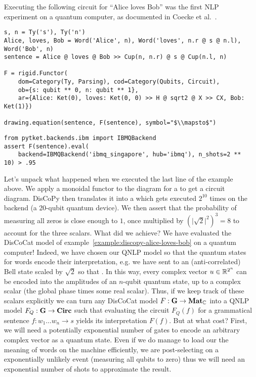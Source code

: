 \begin{example}\label{example:circuit-alive-loves-bob}
Executing the following circuit for ``Alice loves Bob'' was the first NLP experiment on a quantum computer, as documented in Coecke et al.~\cite{CoeckeEtAl20b}.

\begin{verbatim}
s, n = Ty('s'), Ty('n')
Alice, loves, Bob = Word('Alice', n), Word('loves', n.r @ s @ n.l), Word('Bob', n)
sentence = Alice @ loves @ Bob >> Cup(n, n.r) @ s @ Cup(n.l, n)

F = rigid.Functor(
    dom=Category(Ty, Parsing), cod=Category(Qubits, Circuit),
    ob={s: qubit ** 0, n: qubit ** 1},
    ar={Alice: Ket(0), loves: Ket(0, 0) >> H @ sqrt2 @ X >> CX, Bob: Ket(1)})

drawing.equation(sentence, F(sentence), symbol="$\\mapsto$")
\end{verbatim}
\begin{verbatim}
from pytket.backends.ibm import IBMQBackend
assert F(sentence).eval(
    backend=IBMQBackend('ibmq_singapore', hub='ibmq'), n_shots=2 ** 10) > .95
\end{verbatim}
\end{example}

Let's unpack what happened when we executed the last line of the example above.
We apply a monoidal functor  to the diagram for a  to get a circuit diagram.
DisCoPy then translates it into a  which gets executed $2^{10}$ times on the  backend (a 20-qubit quantum device).
We then assert that the probability of measuring all zeros is close enough to $1$, once multiplied by $(\vert \sqrt{2} \vert^2)^3 = 8$ to account for the three scalars.
What did we achieve? We have evaluated the DisCoCat model of example~\ref{example:discopy-alice-loves-bob} on a quantum computer!
Indeed, we have chosen our QNLP model so that the quantum states for words encode their interpretation, e.g. we have sent  to an (anti-correlated) Bell state scaled by $\sqrt{2}$ so that  \py{= [[0, 1], [1, 0]]}.
In this way, every complex vector $u \in \mathbb{R}^{2^n}$ can be encoded into the amplitudes of an $n$-qubit quantum state, up to a complex scalar (the global phase times some real scalar).
Thus, if we keep track of these scalars explicitly we can turn any DisCoCat model $F : \mathbf{G} \to \mathbf{Mat}_{\mathbb{C}}$ into a QNLP model $F_Q : \mathbf{G} \to \mathbf{Circ}$ such that evaluating the circuit $F_Q(f)$ for a grammatical sentence $f : w_1 \dots w_n \to s$ yields its interpretation $F(f)$.
But at what cost?
First, we will need a potentially exponential number of gates to encode an arbitrary complex vector as a quantum state.
Even if we do manage to load our the meaning of words on the machine efficiently, we are post-selecting on a exponentially unlikely event (measuring all qubits to zero) thus we will need an exponential number of shots to approximate the result.
